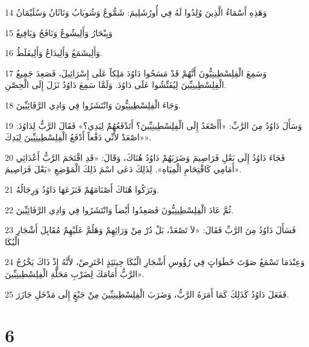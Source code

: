 \par 14 وَهَذِهِ أَسْمَاءُ الَّذِينَ وُلِدُوا لَهُ فِي أُورُشَلِيمَ: شَمُّوعُ وَشُوبَابُ وَنَاثَانُ وَسُلَيْمَانُ
\par 15 وَيِبْحَارُ وَأَلِيشُوعُ وَنَافَجُ وَيَافِيعُ
\par 16 وَأَلِيشَمَعُ وَأَلِيدَاعُ وَأَلِيفَلَطُ.
\par 17 وَسَمِعَ الْفِلِسْطِينِيُّونَ أَنَّهُمْ قَدْ مَسَحُوا دَاوُدَ مَلِكاً عَلَى إِسْرَائِيلَ، فَصَعِدَ جَمِيعُ الْفِلِسْطِينِيِّينَ لِيُفَتِّشُوا عَلَى دَاوُدَ. وَلَمَّا سَمِعَ دَاوُدُ نَزَلَ إِلَى الْحِصْنِ.
\par 18 وَجَاءَ الْفِلِسْطِينِيُّونَ وَانْتَشَرُوا فِي وَادِي الرَّفَائِيِّينَ.
\par 19 وَسَأَلَ دَاوُدُ مِنَ الرَّبِّ: «أَأَصْعَدُ إِلَى الْفِلِسْطِينِيِّينَ؟ أَتَدْفَعُهُمْ لِيَدِي؟» فَقَالَ الرَّبُّ لِدَاوُدَ: «اصْعَدْ لأَنِّي دَفْعاً أَدْفَعُ الْفِلِسْطِينِيِّينَ لِيَدِكَ».
\par 20 فَجَاءَ دَاوُدُ إِلَى بَعْلِ فَرَاصِيمَ وَضَرَبَهُمْ دَاوُدُ هُنَاكَ، وَقَالَ: «قَدِ اقْتَحَمَ الرَّبُّ أَعْدَائِي أَمَامِي كَاقْتِحَامِ الْمِيَاهِ». لِذَلِكَ دَعَى اسْمَ ذَلِكَ الْمَوْضِعِ «بَعْلَ فَرَاصِيمَ».
\par 21 وَتَرَكُوا هُنَاكَ أَصْنَامَهُمْ فَنَزَعَهَا دَاوُدُ وَرِجَالُهُ.
\par 22 ثُمَّ عَادَ الْفِلِسْطِينِيُّونَ فَصَعِدُوا أَيْضاً وَانْتَشَرُوا فِي وَادِي الرَّفَائِيِّينَ.
\par 23 فَسَأَلَ دَاوُدُ مِنَ الرَّبِّ فَقَالَ: «لاَ تَصْعَدْ، بَلْ دُرْ مِنْ وَرَائِهِمْ وَهَلُمَّ عَلَيْهِمْ مُقَابِلَ أَشْجَارِ الْبُكَا
\par 24 وَعِنْدَمَا تَسْمَعُ صَوْتَ خَطَوَاتٍ فِي رُؤُوسِ أَشْجَارِ الْبُكَا حِينَئِذٍ احْتَرِصْ، لأَنَّهُ إِذْ ذَاكَ يَخْرُجُ الرَّبُّ أَمَامَكَ لِضَرْبِ مَحَلَّةِ الْفِلِسْطِينِيِّينَ».
\par 25 فَفَعَلَ دَاوُدُ كَذَلِكَ كَمَا أَمَرَهُ الرَّبُّ، وَضَرَبَ الْفِلِسْطِينِيِّينَ مِنْ جَبْعٍَ إِلَى مَدْخَلِ جَازَرَ.

\chapter{6}

